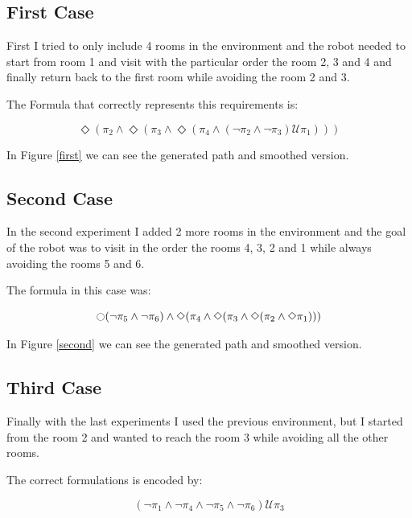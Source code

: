 \documentclass[conference,12pt]{IEEEtran}
\begin{document}
\subsection{First Case}

First I tried to only include 4 rooms in the environment and the robot needed to start from room 1 and visit with the particular order the room 2, 3 and 4 and finally return back to the first room while avoiding the room 2 and 3.

The Formula that correctly represents this requirements is:

\begin{equation}
\Diamond(\pi_2 \wedge \Diamond(\pi_3 \wedge \Diamond(\pi_4 \wedge (\neg \pi_2 \wedge \neg \pi_3) \mathcal{U} \pi_1)))
\end{equation}

In Figure \ref{first} we can see the generated path and smoothed version.

\subsection{Second Case}

In the second experiment I added 2 more rooms in the environment and the goal of the robot was to visit in the order the rooms 4, 3, 2 and 1 while always avoiding the rooms 5 and 6.

The formula in this case was:

\begin{equation}
\ocircle (\neg \pi_5 \wedge \neg \pi_6) \wedge \Diamond(\pi_4 \wedge \Diamond(\pi_3 \wedge \Diamond(\pi_2 \wedge \Diamond \pi_1)))
\end{equation}

In Figure \ref{second} we can see the generated path and smoothed version.

\subsection{Third Case}

 Finally with the last experiments I used the previous environment, but I started from the room 2 and wanted to reach the room 3 while avoiding all the other rooms.
 
The correct formulations is encoded by:

\begin{equation}
(\neg \pi_1 \wedge \neg \pi_4 \wedge \neg \pi_5 \wedge \neg \pi_6) \mathcal{U} \pi_3
\end{equation}
\end{document}
